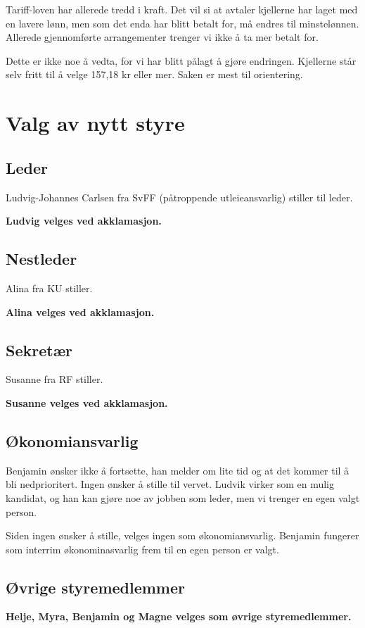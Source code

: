 \documentclass[a4paper,norsk]{article}
\begin{document}
Tariff-loven har allerede tredd i kraft. Det vil si at avtaler kjellerne har laget med en lavere lønn, men som det enda har blitt betalt for, må endres til minstelønnen. Allerede gjennomførte arrangementer trenger vi ikke å ta mer betalt for.

Dette er ikke noe å vedta, for vi har blitt pålagt å gjøre endringen. Kjellerne står selv fritt til å velge 157,18 kr eller mer. Saken er mest til orientering.


\section{Valg av nytt styre}
\subsection{Leder}
Ludvig-Johannes Carlsen fra SvFF (påtroppende utleieansvarlig) stiller til leder. 

\textbf{Ludvig velges ved akklamasjon.}

\subsection{Nestleder}
Alina fra KU stiller.

\textbf{Alina velges ved akklamasjon.}

\subsection{Sekretær}
Susanne fra RF stiller.

\textbf{Susanne velges ved akklamasjon.}

\subsection{Økonomiansvarlig}
Benjamin ønsker ikke å fortsette, han melder om lite tid og at det kommer til å bli nedprioritert. Ingen ønsker å stille til vervet. Ludvik virker som en mulig kandidat, og han kan gjøre noe av jobben som leder, men vi trenger en egen valgt person. 

Siden ingen ønsker å stille, velges ingen som økonomiansvarlig. Benjamin fungerer som interrim økonominasvarlig frem til en egen person er valgt.

\subsection{Øvrige styremedlemmer}
\textbf{Helje, Myra, Benjamin og Magne velges som øvrige styremedlemmer.}
\end{document}
